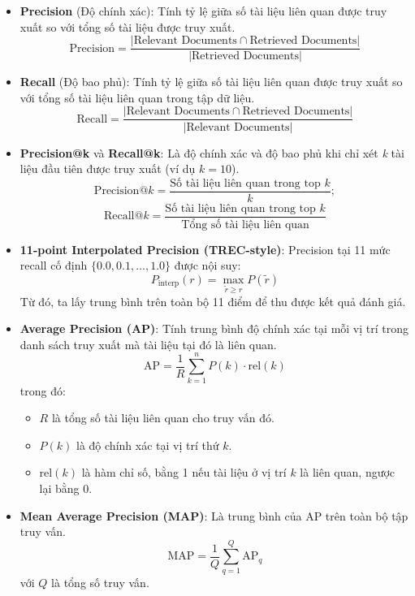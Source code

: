 \begin{itemize}
    \item \textbf{Precision} (Độ chính xác): Tính tỷ lệ giữa số tài liệu liên quan được truy xuất so với tổng số tài liệu được truy xuất.
          \[
              \text{Precision} = \frac{|\text{Relevant Documents} \cap \text{Retrieved Documents}|}{|\text{Retrieved Documents}|}
          \]

    \item \textbf{Recall} (Độ bao phủ): Tính tỷ lệ giữa số tài liệu liên quan được truy xuất so với tổng số tài liệu liên quan trong tập dữ liệu.
          \[
              \text{Recall} = \frac{|\text{Relevant Documents} \cap \text{Retrieved Documents}|}{|\text{Relevant Documents}|}
          \]

    \item \textbf{Precision@k} và \textbf{Recall@k}: Là độ chính xác và độ bao phủ khi chỉ xét \textit{k} tài liệu đầu tiên được truy xuất (ví dụ \(k = 10\)).
          \[
              \text{Precision@}k = \frac{\text{Số tài liệu liên quan trong top } k}{k};
          \]
          \[
              \text{Recall@}k = \frac{\text{Số tài liệu liên quan trong top } k}{\text{Tổng số tài liệu liên quan}}
          \]
    \item \textbf{11-point Interpolated Precision (TREC-style)}: Precision tại 11 mức recall cố định \(\{0.0, 0.1, \ldots, 1.0\}\) được nội suy:
          \[
              P_{\text{interp}}(r) = \max_{\tilde{r} \geq r} P(\tilde{r})
          \]
          Từ đó, ta lấy trung bình trên toàn bộ 11 điểm để thu được kết quả đánh giá.

    \item \textbf{Average Precision (AP)}: Tính trung bình độ chính xác tại mỗi vị trí trong danh sách truy xuất mà tài liệu tại đó là liên quan.
          \[
              \text{AP} = \frac{1}{R} \sum_{k=1}^{n} P(k) \cdot \text{rel}(k)
          \]
          trong đó:
          \begin{itemize}
              \item \(R\) là tổng số tài liệu liên quan cho truy vấn đó.
              \item \(P(k)\) là độ chính xác tại vị trí thứ \(k\).
              \item \(\text{rel}(k)\) là hàm chỉ số, bằng 1 nếu tài liệu ở vị trí \(k\) là liên quan, ngược lại bằng 0.
          \end{itemize}

    \item \textbf{Mean Average Precision (MAP)}: Là trung bình của AP trên toàn bộ tập truy vấn.
          \[
              \text{MAP} = \frac{1}{Q} \sum_{q=1}^{Q} \text{AP}_q
          \]
          với \(Q\) là tổng số truy vấn.
\end{itemize}
